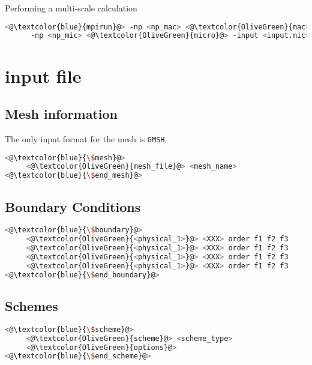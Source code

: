 Performing a multi-scale calculation
\begin{lstlisting}[frame=single,language=bash]
<@\textcolor{blue}{mpirun}@> -np <np_mac> <@\textcolor{OliveGreen}{macro}@> -input <input.mac> :
      -np <np_mic> <@\textcolor{OliveGreen}{micro}@> -input <input.mic>
\end{lstlisting}


\section{\macro input file}

\subsection{Mesh information}

The only input format for the mesh is \texttt{GMSH}.

\begin{lstlisting}[frame=single,language=bash]
<@\textcolor{blue}{\$mesh}@> 
     <@\textcolor{OliveGreen}{mesh_file}@> <mesh_name> 
<@\textcolor{blue}{\$end_mesh}@> 
\end{lstlisting}

\subsection{Boundary Conditions}

\begin{lstlisting}[frame=single,language=bash]
<@\textcolor{blue}{\$boundary}@> 
     <@\textcolor{OliveGreen}{<physical_1>}@> <XXX> order f1 f2 f3
     <@\textcolor{OliveGreen}{<physical_1>}@> <XXX> order f1 f2 f3
     <@\textcolor{OliveGreen}{<physical_1>}@> <XXX> order f1 f2 f3
     <@\textcolor{OliveGreen}{<physical_1>}@> <XXX> order f1 f2 f3
<@\textcolor{blue}{\$end_boundary}@> 
\end{lstlisting}

\subsection{Schemes}

\begin{lstlisting}[frame=single,language=bash]
<@\textcolor{blue}{\$scheme}@> 
     <@\textcolor{OliveGreen}{scheme}@> <scheme_type>
     <@\textcolor{OliveGreen}{options}@> 
<@\textcolor{blue}{\$end_scheme}@> 
\end{lstlisting}

